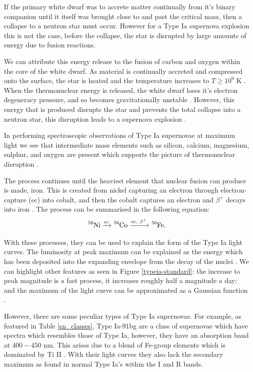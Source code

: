 \documentclass[twocolumn]{revtex4}
\begin{document}
If the primary white dwarf was to accrete matter continually from it's binary companion until it itself was brought close to and past the critical mass, then a collapse to a neutron star must occur. However for a Type Ia supernova explosion this is not the case, before the collapse, the star is disrupted by large amounts of energy due to fusion reactions.

We can attribute this energy release to the fusion of carbon and oxygen within the core of the white dwarf. As material is continually accreted and compressed onto the surface, the star is heated and the temperature increases to $T \geq 10^9$ K \cite{longair}. When the thermonuclear energy is released, the white dwarf loses it's electron degeneracy pressure, and so becomes gravitationally unstable \cite{longair}. However, this energy that is produced disrupts the star and prevents the total collapse into a neutron star, this disruption leads to a supernova explosion \cite{posn}. 

In performing spectroscopic observations of Type Ia supernovae at maximum light we see that intermediate mass elements such as silicon, calcium, magnesium, sulphur, and oxygen are present which supports the picture of thermonuclear disruption \cite{longair, mod_ast}.

The process continues until the heaviest element that nuclear fusion can produce is made, iron. This is created from nickel capturing an electron through electron-capture (ec) into cobalt, and then the cobalt captures an electron and $\beta^{+}$ decays into iron \cite{mod_ast}. The process can be summarised in the following equation:
\begin{equation*}
\ce{^{56}Ni} \xrightarrow{\text{ec}} \ce{^{56}Co} \xrightarrow{\text{ec, $\beta^{+}$}} \ce{^{56}Fe}.
\end{equation*}

With these processes, they can be used to explain the form of the Type Ia light curves. The luminosity at peak maximum can be explained as the energy which has been deposited into the expanding envelope from the decay of the  nuclei \cite{mod_ast}. We can highlight other features as seen in Figure \ref{typeia-standard}: the increase to peak magnitude is a fast process, it increases roughly half a magnitude a day; and the maximum of the light curve can be approximated as a Gaussian function \cite{mod_ast}. 

However, there are some peculiar types of Type Ia supernovae. For example, as featured in Table \ref{sn_classes}, Type Ia-91bg are a class of supernovae which have spectra which resembles those of Type Ia, however, they have an absorption band at $400-450$ nm. This arises due to a blend of Fe-group elements which is dominated by Ti II \cite{obs_phys_class_sn}. With their light curves they also lack the secondary maximum as found in normal Type Ia's within the I and R bands.
\end{document}
